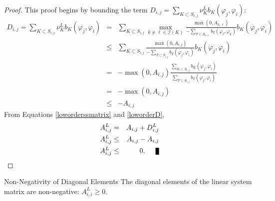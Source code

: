 \begin{proof}
This proof begins by bounding the term
$D_{i,j}=\sum\limits_{K\subset S_{i,j}}\nu_K^L b_K(\varphi_j, \varphi_i)$:
\begin{eqnarray*}
   D_{i,j}=\sum\limits_{K\subset S_{i,j}}\nu_K^L b_K(\varphi_j, \varphi_i)
   & = & \sum\limits_{K\subset S_{i,j}} \max\limits_{k\ne \ell\in \mathcal{I}(K)}
      \frac{\max(0,A_{k,\ell})}
		{-\sum\limits_{T\subset S_{k,\ell}} b_T(\varphi_{\ell}, \varphi_k)}
      b_K(\varphi_j,\varphi_i)\\
   & \le & \sum\limits_{K\subset S_{i,j}} \frac{\max(0,A_{i,j})}
		{-\sum\limits_{T\subset S_{i,j}} b_T(\varphi_j, \varphi_i)}b_K(\varphi_j,\varphi_i)\\
   & =   & -\max(0,A_{i,j}) \frac{\sum\limits_{K\subset S_{i,j}}
      b_K(\varphi_j,\varphi_i)}
		{\sum\limits_{T\subset S_{i,j}} b_T(\varphi_j, \varphi_i)}\\   
   & = & -\max(0,A_{i,j})\\
   & \le & -A_{i,j}
\end{eqnarray*}
From Equations \eqref{loworderssmatrix} and \eqref{loworderD},
\begin{eqnarray*}
	A^L_{i,j} & = & A_{i,j} + D_{i,j}^L\\
   A^L_{i,j} & \le & A_{i,j} - A_{i,j}\\
   A^L_{i,j} & \le & 0.\qed
\end{eqnarray*}
\end{proof}
\begin{lemma}[label={diagonalpositive_gt}]{Non-Negativity of Diagonal Elements}
   The diagonal elements  of the linear system matrix are non-negative: $A^L_{i,i}\ge 0$.
\end{lemma}

